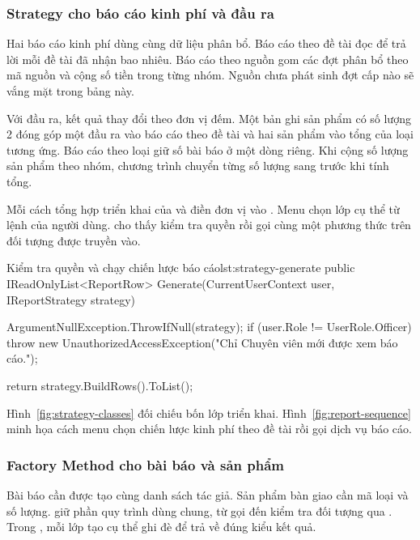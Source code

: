 \subsubsection{Strategy cho báo cáo kinh phí và đầu ra}\label{sec:pattern-strategy}

Hai báo cáo kinh phí dùng cùng dữ liệu phân bổ. Báo cáo theo đề tài đọc  để trả lời mỗi đề tài đã nhận bao nhiêu. Báo cáo theo nguồn gom các đợt phân bổ theo mã nguồn và cộng số tiền trong từng nhóm. Nguồn chưa phát sinh đợt cấp nào sẽ vắng mặt trong bảng này.

Với đầu ra, kết quả thay đổi theo đơn vị đếm. Một bản ghi sản phẩm có số lượng 2 đóng góp một đầu ra vào báo cáo theo đề tài và hai sản phẩm vào tổng của loại tương ứng. Báo cáo theo loại giữ số bài báo ở một dòng riêng. Khi cộng số lượng sản phẩm theo nhóm, chương trình chuyển từng số lượng  sang  trước khi tính tổng.

Mỗi cách tổng hợp triển khai  của  và điền đơn vị vào . Menu chọn lớp cụ thể từ lệnh của người dùng.  cho thấy  kiểm tra quyền rồi gọi cùng một phương thức trên đối tượng được truyền vào.

\begin{ReportCode}[firstnumber=10,gobble=4]{Kiểm tra quyền và chạy chiến lược báo cáo}{lst:strategy-generate}
    public IReadOnlyList<ReportRow> Generate(CurrentUserContext user, IReportStrategy strategy)
    {
        ArgumentNullException.ThrowIfNull(strategy);
        if (user.Role != UserRole.Officer)
            throw new UnauthorizedAccessException("Chỉ Chuyên viên mới được xem báo cáo.");

        return strategy.BuildRows().ToList();
    }
\end{ReportCode}

Hình~\ref{fig:strategy-classes} đối chiếu bốn lớp triển khai. Hình~\ref{fig:report-sequence} minh họa cách menu chọn chiến lược kinh phí theo đề tài rồi gọi dịch vụ báo cáo.

\subsubsection{Factory Method cho bài báo và sản phẩm}\label{sec:pattern-factory}
Bài báo cần được tạo cùng danh sách tác giả. Sản phẩm bàn giao cần mã loại và số lượng.  giữ phần quy trình dùng chung, từ gọi  đến kiểm tra đối tượng qua . Trong , mỗi lớp tạo cụ thể ghi đè  để trả về đúng kiểu kết quả.

